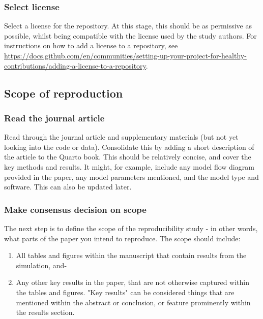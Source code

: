 \subsubsection{Select license}
\timeno

Select a license for the repository. At this stage, this should be as permissive as possible, whilst being compatible with the license used by the study authors. For instructions on how to add a license to a repository, see \url{https://docs.github.com/en/communities/setting-up-your-project-for-healthy-contributions/adding-a-license-to-a-repository}.

\subsection{Scope of reproduction}

\subsubsection{Read the journal article}
\timeyes

Read through the journal article and supplementary materials (but not yet looking into the code or data). Consolidate this by adding a short description of the article to the Quarto book. This should be relatively concise, and cover the key methods and results. It might, for example, include any model flow diagram provided in the paper, any model parameters mentioned, and the model type and software. This can also be updated later.

\subsubsection{Make consensus decision on scope}

The next step is to define the scope of the reproducibility study - in other words, what parts of the paper you intend to reproduce. The scope should include:
\begin{enumerate}[label=(\alph*)]
    \item All tables and figures within the manuscript that contain results from the simulation, and-
    \item Any other key results in the paper, that are not otherwise captured within the tables and figures. "Key results" can be considered things that are mentioned within the abstract or conclusion, or feature prominently within the results section.
\end{enumerate}

